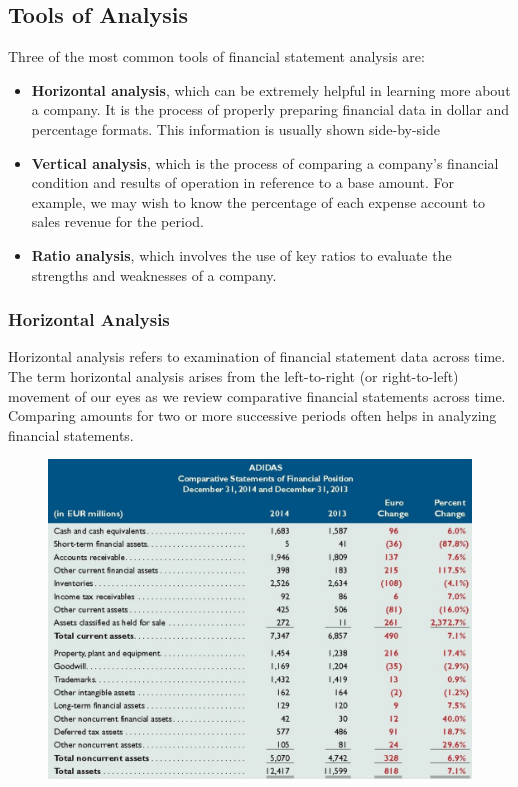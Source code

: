 \documentclass[../main.tex]{subfiles}
\begin{document}
	\subsection{Tools of Analysis}
	
	Three of the most common tools of financial statement analysis are:
	\begin{itemize}[noitemsep]
		\item \textbf{Horizontal analysis}, which can be extremely helpful in 
		learning more about a company.  It is the process of properly preparing 
		financial data in dollar and percentage formats. This information is 
		usually shown side-by-side
		\item \textbf{Vertical analysis}, which is the process of comparing a 
		company’s financial condition and results of operation in reference to 
		a base amount. For example, we may wish to know the percentage of each 
		expense account to sales revenue for the period.
		\item \textbf{Ratio analysis}, which involves the use of key ratios to 
		evaluate the strengths and weaknesses of a company. 
	\end{itemize}
	
	\subsubsection{Horizontal Analysis}
	
	Horizontal analysis refers to examination of financial statement data 
	across time. The term horizontal analysis arises from the left-to-right (or 
	right-to-left) movement of our eyes as we review comparative financial 
	statements across time. Comparing amounts for two or more successive 
	periods often helps in analyzing financial statements.
	
	\begin{figure}[ht]
		\centering
		\includegraphics[width=\columnwidth]{images/c12/horizontal_analysis.png}
	\end{figure}
\end{document}
